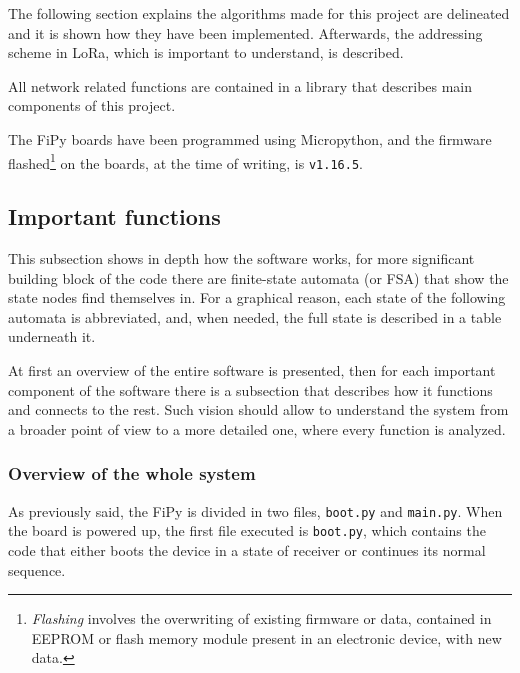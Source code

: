 		The following section explains the algorithms made for this project are delineated and it is shown how they have been implemented.
		Afterwards, the addressing scheme in LoRa, which is important to understand, is described.
		
		All network related functions are contained in a library that describes main components of this project.
		
		The FiPy boards have been programmed using Micropython, and the firmware flashed\footnote{ \textit{Flashing} involves the overwriting of existing firmware or data, contained in EEPROM or flash memory module present in an electronic device, with new data.} on the boards, at the time of writing, is \texttt{v1.16.5}.
		
		\subsection{Important functions}\label{subsec:algorithms}
	
			

			This subsection shows in depth how the software works, for more significant building block of the code there are finite-state automata (or FSA) that show the state nodes find themselves in.
			For a graphical reason, each state of the following automata is abbreviated, and, when needed, the full state is described in a table underneath it.
			
			At first an overview of the entire software is presented, then for each important component of the software there is a subsection that describes how it functions and connects to the rest.
			Such vision should allow to understand the system from a broader point of view to a more detailed one, where every function is analyzed.
			
			\subsubsection{Overview of the whole system}
			
				As previously said, the FiPy is divided in two files, \texttt{boot.py} and \texttt{main.py}.
				When the board is powered up, the first file executed is \texttt{boot.py}, which contains the code that either boots the device in a state of receiver or continues its normal sequence.
				
